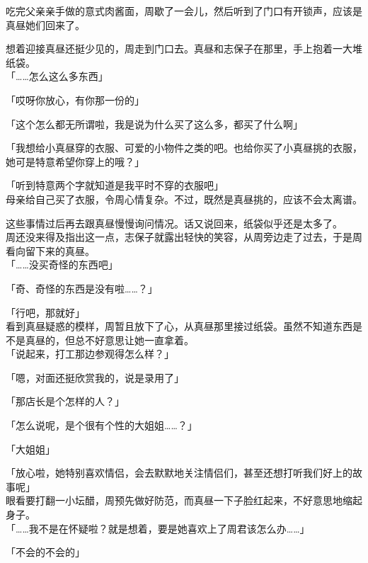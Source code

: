 \vspace{2\baselineskip}

吃完父亲亲手做的意式肉酱面，周歇了一会儿，然后听到了门口有开锁声，应该是真昼她们回来了。

想着迎接真昼还挺少见的，周走到门口去。真昼和志保子在那里，手上抱着一大堆纸袋。\\

「……怎么这么多东西」

「哎呀你放心，有你那一份的」

「这个怎么都无所谓啦，我是说为什么买了这么多，都买了什么啊」

「我想给小真昼穿的衣服、可爱的小物件之类的吧。也给你买了小真昼挑的衣服，她可是特意希望你穿上的哦？」

「听到特意两个字就知道是我平时不穿的衣服吧」\\

母亲给自己买了衣服，令周心情复杂。不过，既然是真昼挑的，应该不会太离谱。

这些事情过后再去跟真昼慢慢询问情况。话又说回来，纸袋似乎还是太多了。\\

周还没来得及指出这一点，志保子就露出轻快的笑容，从周旁边走了过去，于是周看向留下来的真昼。\\

「……没买奇怪的东西吧」

「奇、奇怪的东西是没有啦……？」

「行吧，那就好」\\

看到真昼疑惑的模样，周暂且放下了心，从真昼那里接过纸袋。虽然不知道东西是不是真昼的，但总不好意思让她一直拿着。\\

「说起来，打工那边参观得怎么样？」

「嗯，对面还挺欣赏我的，说是录用了」

「那店长是个怎样的人？」

「怎么说呢，是个很有个性的大姐姐……？」

「大姐姐」

「放心啦，她特别喜欢情侣，会去默默地关注情侣们，甚至还想打听我们好上的故事呢」\\

眼看要打翻一小坛醋，周预先做好防范，而真昼一下子脸红起来，不好意思地缩起身子。\\

「……我不是在怀疑啦？就是想着，要是她喜欢上了周君该怎么办……」

「不会的不会的」


